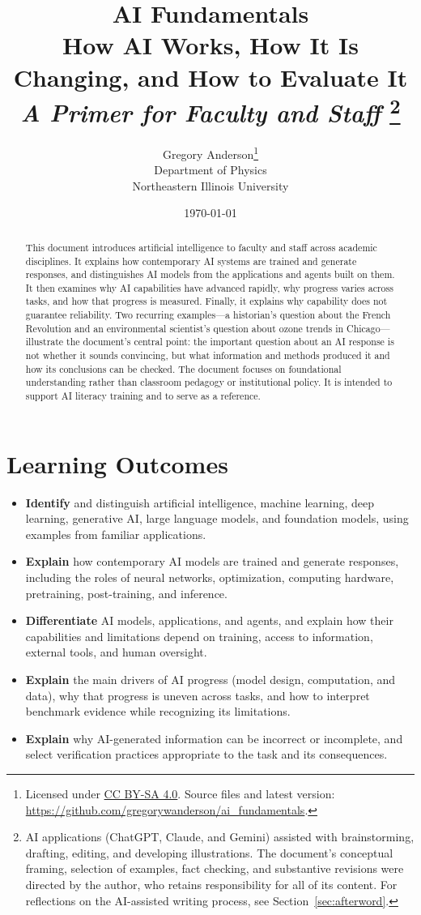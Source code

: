 \documentclass[11pt]{article}
\title{
    \textbf{AI Fundamentals}\\[4pt]
    \large How AI Works, How It Is Changing, and How to Evaluate It\\
    \textit{A Primer for Faculty and Staff}%
  \footnote{
  AI applications (ChatGPT, Claude, and Gemini) assisted with brainstorming, drafting, editing, and developing illustrations. The document's conceptual framing, selection of examples, fact checking, and substantive revisions were directed by the author, who retains responsibility for all of its content.
  For reflections on the AI-assisted writing process, see Section~\ref{sec:afterword}.}
}
\author{
    Gregory Anderson\thanks{Licensed under \ccbysa
  \href{https://creativecommons.org/licenses/by-sa/4.0/}{CC BY-SA 4.0}.
  Source files and latest version:
  \url{https://github.com/gregorywanderson/ai_fundamentals}.}\\
    {\small Department of Physics}\\
    {\small Northeastern Illinois University}
}
\date{\today}
\begin{document}
\maketitle

\begin{abstract}
This document introduces artificial intelligence to faculty and staff across academic disciplines. It explains how contemporary AI systems are trained and generate responses, and distinguishes AI models from the applications and agents built on them. It then examines why AI capabilities have advanced rapidly, why progress varies across tasks, and how that progress is measured. Finally, it explains why capability does not guarantee reliability. Two recurring examples---a historian's question about the French Revolution and an environmental scientist's question about ozone trends in Chicago---illustrate the document's central point: the important question about an AI response is not whether it sounds convincing, but what information and methods produced it and how its conclusions can be checked. The document focuses on foundational understanding rather than classroom pedagogy or institutional policy. It is intended to support AI literacy training and to serve as a reference. 
\end{abstract}

\clearpage
\tableofcontents

\clearpage
\section*{Learning Outcomes}

\begin{itemize}
\item\textbf{Identify} and distinguish artificial intelligence, machine learning, deep learning, generative AI, large language models, and foundation models, using examples from familiar applications.
\item\textbf{Explain}
how contemporary AI models are trained and generate responses, including the roles of neural networks, optimization, computing hardware, pretraining, post-training, and inference.
\item\textbf{Differentiate}
  AI models, applications, and agents, and explain how their capabilities and limitations depend on training, access to information, external tools, and human oversight.
\item\textbf{Explain}
the main drivers of AI progress (model design, computation, and data), why that progress is uneven across tasks, and how to interpret benchmark evidence while recognizing its limitations.
\item\textbf{Explain} why AI-generated information can be incorrect or incomplete, and select verification practices appropriate to the task and its consequences.
\end{itemize}
\end{document}
